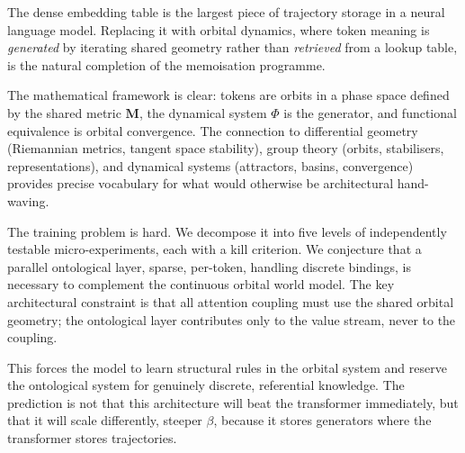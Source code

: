 \documentclass[11pt, a4paper]{article}
\newcommand{\M}{\mathbf{M}}
\theoremstyle{remark}
\begin{document}
The dense embedding table is the largest piece of trajectory storage in a neural language model.
Replacing it with orbital dynamics, where token meaning is \emph{generated} by iterating shared geometry rather than \emph{retrieved} from a lookup table, is the natural completion of the memoisation programme.

The mathematical framework is clear: tokens are orbits in a phase space defined by the shared metric $\M$, the dynamical system $\Phi$ is the generator, and functional equivalence is orbital convergence.
The connection to differential geometry (Riemannian metrics, tangent space stability), group theory (orbits, stabilisers, representations), and dynamical systems (attractors, basins, convergence) provides precise vocabulary for what would otherwise be architectural hand-waving.

The training problem is hard.
We decompose it into five levels of independently testable micro-experiments, each with a kill criterion.
We conjecture that a parallel ontological layer, sparse, per-token, handling discrete bindings, is necessary to complement the continuous orbital world model.
The key architectural constraint is that all attention coupling must use the shared orbital geometry; the ontological layer contributes only to the value stream, never to the coupling.

This forces the model to learn structural rules in the orbital system and reserve the ontological system for genuinely discrete, referential knowledge.
The prediction is not that this architecture will beat the transformer immediately, but that it will scale differently, steeper $\beta$, because it stores generators where the transformer stores trajectories.
\end{document}
